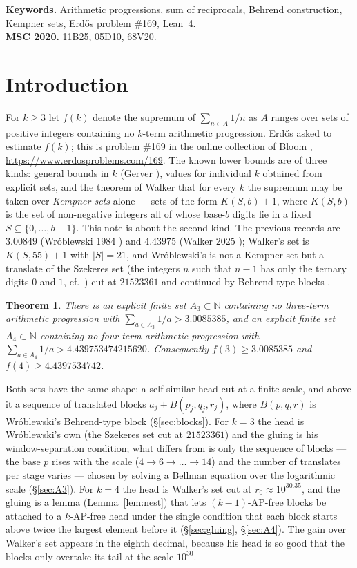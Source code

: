 \documentclass[11pt,a4paper]{article}
\newtheorem{theorem}{Theorem}[section]
\theoremstyle{definition}
\theoremstyle{remark}
\newcommand{\N}{\mathbb{N}}
\newcommand{\Blk}{B}
\begin{document}
\noindent\textbf{Keywords.} Arithmetic progressions, sum of reciprocals, Behrend construction, Kempner sets, Erd\H{o}s problem \#169, Lean~4.\\
\textbf{MSC 2020.} 11B25, 05D10, 68V20.

\section{Introduction}\label{sec:intro}

For $k\ge3$ let $f(k)$ denote the supremum of $\sum_{n\in A} 1/n$ as $A$ ranges over sets of positive integers containing no $k$-term arithmetic progression. Erd\H{o}s asked to estimate $f(k)$; this is problem \#169 in the online collection of Bloom \cite{EP169}, \url{https://www.erdosproblems.com/169}. The known lower bounds are of three kinds: general bounds in $k$ (Gerver \cite{Ge77}), values for individual $k$ obtained from explicit sets, and the theorem of Walker \cite{Wa25} that for every $k$ the supremum may be taken over \emph{Kempner sets} alone --- sets of the form $K(S,b)+1$, where $K(S,b)$ is the set of non-negative integers all of whose base-$b$ digits lie in a fixed $S \subseteq \{0,\dots,b-1\}$. This note is about the second kind. The previous records are $3.00849$ (Wr\'oblewski 1984 \cite{Wr84}) and $4.43975$ (Walker 2025 \cite{Wa25}); Walker's set is $K(S,55)+1$ with $|S| = 21$, and Wr\'oblewski's is not a Kempner set but a translate of the Szekeres set (the integers $n$ such that $n-1$ has only the ternary digits $0$ and $1$, cf.\ \cite{ET36}) cut at $21523361$ and continued by Behrend-type blocks \cite{Be46}.

\begin{theorem}\label{thm:main}
There is an explicit finite set $A_3 \subset \N$ containing no three-term arithmetic progression with $\sum_{a\in A_3} 1/a > 3.0085385$, and an explicit finite set $A_4 \subset \N$ containing no four-term arithmetic progression with $\sum_{a\in A_4} 1/a > 4.439753474215620$. Consequently $f(3) \ge 3.0085385$ and $f(4) \ge 4.4397534742$.
\end{theorem}

Both sets have the same shape: a self-similar head cut at a finite scale, and above it a sequence of translated blocks $a_j + \Blk(p_j,q_j,r_j)$, where $\Blk(p,q,r)$ is Wr\'oblewski's Behrend-type block (\S\ref{sec:blocks}). For $k = 3$ the head is Wr\'oblewski's own (the Szekeres set cut at $21523361$) and the gluing is his window-separation condition; what differs from \cite{Wr84} is only the sequence of blocks --- the base $p$ rises with the scale ($4 \to 6 \to \dots \to 14$) and the number of translates per stage varies --- chosen by solving a Bellman equation over the logarithmic scale (\S\ref{sec:A3}). For $k = 4$ the head is Walker's set cut at $r_0 \approx 10^{30.35}$, and the gluing is a lemma (Lemma~\ref{lem:nest}) that lets $(k-1)$-AP-free blocks be attached to a $k$-AP-free head under the single condition that each block starts above twice the largest element before it (\S\ref{sec:gluing}, \S\ref{sec:A4}). The gain over Walker's set appears in the eighth decimal, because his head is so good that the blocks only overtake its tail at the scale $10^{30}$.
\end{document}
